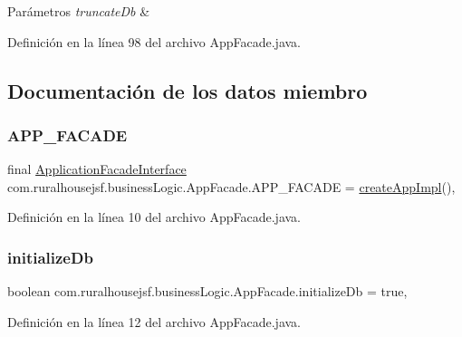 \begin{DoxyParams}{Parámetros}
{\em truncate\+Db} & \\
\hline
\end{DoxyParams}


Definición en la línea 98 del archivo App\+Facade.\+java.



\subsection{Documentación de los datos miembro}
\mbox{\label{a00128_a112b5fb14ea720f893a3c52a26a775c9}} 
\subsubsection{\texorpdfstring{APP\_FACADE}{APP\_FACADE}}
{\footnotesize\ttfamily final \mbox{\hyperlink{a00136}{Application\+Facade\+Interface}} com.\+ruralhousejsf.\+business\+Logic.\+App\+Facade.\+A\+P\+P\+\_\+\+F\+A\+C\+A\+DE = \mbox{\hyperlink{a00128_a8f4d396c7d2ce6ba084554d68385fc34}{create\+App\+Impl}}()\hspace{0.3cm}{\ttfamily [static]}, {\ttfamily [private]}}



Definición en la línea 10 del archivo App\+Facade.\+java.

\mbox{\label{a00128_a08e1f188faabf8bef71610c49bdd5d84}} 
\subsubsection{\texorpdfstring{initializeDb}{initializeDb}}
{\footnotesize\ttfamily boolean com.\+ruralhousejsf.\+business\+Logic.\+App\+Facade.\+initialize\+Db = true\hspace{0.3cm}{\ttfamily [static]}, {\ttfamily [private]}}



Definición en la línea 12 del archivo App\+Facade.\+java.

